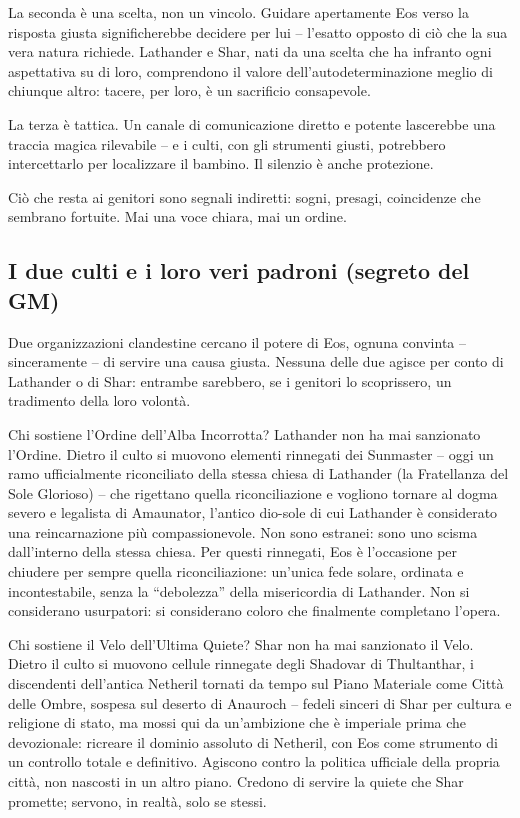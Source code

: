 La seconda è una scelta, non un vincolo. Guidare apertamente Eos verso la risposta giusta significherebbe decidere per lui -- l'esatto opposto di ciò che la sua vera natura richiede. Lathander e Shar, nati da una scelta che ha infranto ogni aspettativa su di loro, comprendono il valore dell'autodeterminazione meglio di chiunque altro: tacere, per loro, è un sacrificio consapevole.

La terza è tattica. Un canale di comunicazione diretto e potente lascerebbe una traccia magica rilevabile -- e i culti, con gli strumenti giusti, potrebbero intercettarlo per localizzare il bambino. Il silenzio è anche protezione.

Ciò che resta ai genitori sono segnali indiretti: sogni, presagi, coincidenze che sembrano fortuite. Mai una voce chiara, mai un ordine.

\subsection{I due culti e i loro veri padroni (segreto del GM)}

Due organizzazioni clandestine cercano il potere di Eos, ognuna convinta -- sinceramente -- di servire una causa giusta. Nessuna delle due agisce per conto di Lathander o di Shar: entrambe sarebbero, se i genitori lo scoprissero, un tradimento della loro volontà.

\begin{DndSidebar}[float=!b]{Chi sostiene l'Ordine dell'Alba Incorrotta?}
  Lathander non ha mai sanzionato l'Ordine. Dietro il culto si muovono elementi rinnegati dei Sunmaster -- oggi un ramo ufficialmente riconciliato della stessa chiesa di Lathander (la Fratellanza del Sole Glorioso) -- che rigettano quella riconciliazione e vogliono tornare al dogma severo e legalista di Amaunator, l'antico dio-sole di cui Lathander è considerato una reincarnazione più compassionevole. Non sono estranei: sono uno scisma dall'interno della stessa chiesa. Per questi rinnegati, Eos è l'occasione per chiudere per sempre quella riconciliazione: un'unica fede solare, ordinata e incontestabile, senza la ``debolezza'' della misericordia di Lathander. Non si considerano usurpatori: si considerano coloro che finalmente completano l'opera.
\end{DndSidebar}

\begin{DndSidebar}[float=!b]{Chi sostiene il Velo dell'Ultima Quiete?}
  Shar non ha mai sanzionato il Velo. Dietro il culto si muovono cellule rinnegate degli Shadovar di Thultanthar, i discendenti dell'antica Netheril tornati da tempo sul Piano Materiale come Città delle Ombre, sospesa sul deserto di Anauroch -- fedeli sinceri di Shar per cultura e religione di stato, ma mossi qui da un'ambizione che è imperiale prima che devozionale: ricreare il dominio assoluto di Netheril, con Eos come strumento di un controllo totale e definitivo. Agiscono contro la politica ufficiale della propria città, non nascosti in un altro piano. Credono di servire la quiete che Shar promette; servono, in realtà, solo se stessi.
\end{DndSidebar}

